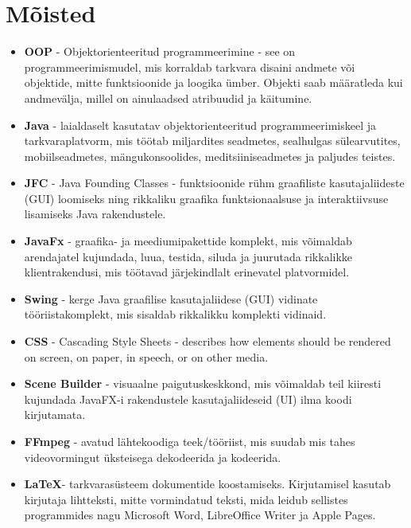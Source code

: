 \section*{Mõisted}
\begin{itemize}
    \item \textbf{OOP} - Objektorienteeritud programmeerimine - see on programmeerimismudel, mis korraldab tarkvara disaini andmete või objektide, mitte funktsioonide ja loogika ümber. Objekti saab määratleda kui andmevälja, millel on ainulaadsed atribuudid ja käitumine.
    \item \textbf{Java} - laialdaselt kasutatav objektorienteeritud programmeerimiskeel ja tarkvaraplatvorm, mis töötab miljardites seadmetes, sealhulgas sülearvutites, mobiilseadmetes, mängukonsoolides, meditsiiniseadmetes ja paljudes teistes.
    \item \textbf{JFC} - Java Founding Classes - funktsioonide rühm graafiliste kasutajaliideste (GUI) loomiseks ning rikkaliku graafika funktsionaalsuse ja interaktiivsuse lisamiseks Java rakendustele.
    \item \textbf{JavaFx} - graafika- ja meediumipakettide komplekt, mis võimaldab arendajatel kujundada, luua, testida, siluda ja juurutada rikkalikke klientrakendusi, mis töötavad järjekindlalt erinevatel platvormidel.
    \item \textbf{Swing} - kerge Java graafilise kasutajaliidese (GUI) vidinate tööriistakomplekt, mis sisaldab rikkalikku komplekti vidinaid.
    \item \textbf{CSS} - Cascading Style Sheets - describes how elements should be rendered on screen, on paper, in speech, or on other media.
    \item \textbf{Scene Builder} - visuaalne paigutuskeskkond, mis võimaldab teil kiiresti kujundada JavaFX-i rakendustele kasutajaliideseid (UI) ilma koodi kirjutamata.
    \item \textbf{FFmpeg} - avatud lähtekoodiga teek/tööriist, mis suudab mis tahes videovormingut üksteisega dekodeerida ja kodeerida.
    \item \textbf{\LaTeX }- tarkvarasüsteem dokumentide koostamiseks. Kirjutamisel kasutab kirjutaja lihtteksti, mitte vormindatud teksti, mida leidub sellistes programmides nagu Microsoft Word, LibreOffice Writer ja Apple Pages.
\end{itemize}
\newpage
